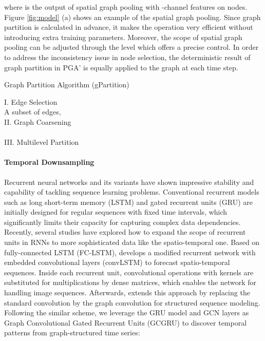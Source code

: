 \documentclass[sigconf,screen]{acmart}
\begin{document}
where  is the output of spatial graph pooling with -channel features on  nodes. Figure \ref{fig:model} (a) shows an example of the spatial graph pooling. Since graph partition is calculated in advance, it makes the operation very efficient without introducing extra training parameters. Moreover, the scope of spatial graph pooling can be adjusted through the level  which offers a precise control. In order to address the inconsistency issue in node selection, the deterministic result of graph partition in PGA' is equally applied to the graph  at each time step.
\begin{algorithm}
\caption{\label{alg:pga} Graph Partition Algorithm (gPartition)} 


\nonl I. Edge Selection\\
A subset of edges, \;
\Return \\
\nonl II. Graph Coarsening\\
\Return  \label{alg:loop}\\
\nonl III. Multilevel Partition\\
\end{algorithm}

\paragraph{Temporal Downsampling}
Recurrent neural networks and its variants have shown impressive stability and capability of tackling sequence learning problems. Conventional recurrent models such as long short-term memory (LSTM) \cite{hochreiter1997long} and gated recurrent units (GRU) \cite{chung2014empirical} are initially designed for regular sequences with fixed time intervals, which significantly limits their capacity for capturing complex data dependencies. Recently, several studies have explored how to expand the scope of recurrent units in RNNs to more sophisticated data like the spatio-temporal one. Based on fully-connected LSTM (FC-LSTM), \cite{xingjian2015convolutional} develops a modified recurrent network with embedded convolutional layers (convLSTM) to forecast spatio-temporal sequences. Inside each recurrent unit, convolutional operations with kernels are substituted for multiplications by dense matrices, which enables the network for handling image sequences. Afterwards, \cite{seo2018structured} extends this approach by replacing the standard convolution by the graph convolution for structured sequence modeling. Following the similar scheme, we leverage the GRU model and GCN layers as Graph Convolutional Gated Recurrent Units (GCGRU) to discover temporal patterns from graph-structured time series:
\end{document}
